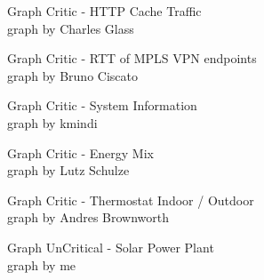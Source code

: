 
\begin{frame}{Graph Critic - HTTP Cache Traffic}
\\
graph by Charles Glass
\end{frame}

\begin{frame}{Graph Critic - RTT of MPLS VPN endpoints}
\\
graph by Bruno Ciscato
\end{frame}

\begin{frame}{Graph Critic - System Information}
\\
graph by kmindi
\end{frame}

\begin{frame}{Graph Critic - Energy Mix}
\\
graph by Lutz Schulze
\end{frame}

\begin{frame}{Graph Critic - Thermostat Indoor / Outdoor}
\\
graph by Andres Brownworth
\end{frame}

\begin{frame}{Graph UnCritical - Solar Power Plant}
\\
graph by me
\end{frame}



